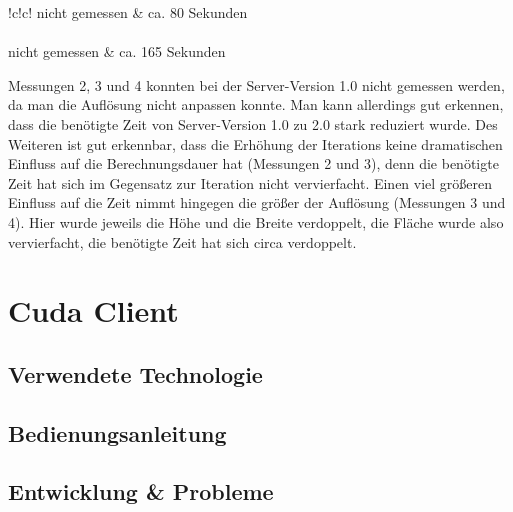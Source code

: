 \documentclass[12pt, onecolumn,notitlepage]{scrartcl}
\begin{document}
\begin{table}[H]
{\begin{tabular}{!{\color{black}\vrule}c!{\color{black}\vrule}c!{\color{black}\vrule}}
		\hline
		nicht
		gemessen     & ca.
		80 Sekunden                                                                                                                                                                            \\ 
		\hline
		        \\ 
		\hline
		nicht
		gemessen     & ca.
		165 Sekunden                                                                                                                                                                           \\
		\hline
	\end{tabular}
}

\end{table}

Messungen 2, 3 und 4 konnten bei der Server-Version 1.0 nicht gemessen werden, da man die Auflösung nicht anpassen konnte. Man kann allerdings gut erkennen, dass die benötigte Zeit von Server-Version 1.0 zu 2.0 stark reduziert wurde. Des Weiteren ist gut erkennbar, dass die Erhöhung der Iterations keine dramatischen Einfluss auf die Berechnungsdauer hat (Messungen 2 und 3), denn die benötigte Zeit hat sich im Gegensatz zur Iteration nicht vervierfacht. Einen viel größeren Einfluss auf die Zeit nimmt hingegen die größer der Auflösung (Messungen 3 und 4). Hier wurde jeweils die Höhe und die Breite verdoppelt, die Fläche wurde also vervierfacht, die benötigte Zeit hat sich circa verdoppelt.


\section{Cuda Client}
\subsection{Verwendete Technologie}
\subsection{Bedienungsanleitung}
\subsection{Entwicklung \& Probleme}
\end{document}
